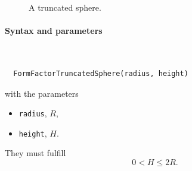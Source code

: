 \begin{figure}[H]
\hfill
{}
\hfill
{}
\hfill
{}
\hfill
\caption{A truncated sphere.}
\end{figure}
\FloatBarrier

\paragraph{Syntax and parameters}\strut\\[-2ex plus .2ex minus .2ex]
\begin{lstlisting}
  FormFactorTruncatedSphere(radius, height)
\end{lstlisting}
with the parameters
\begin{itemize}
\item \texttt{radius}, $R$,
\item \texttt{height}, $H$.
\end{itemize}
They must fulfill
\begin{displaymath}
   0 < H\leq 2R.
\end{displaymath}


